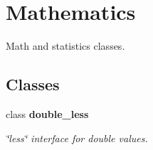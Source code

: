 \section{Mathematics}
\label{group___mathematics}


Math and statistics classes.  


\subsection*{Classes}
\begin{DoxyCompactItemize}
\item 
class {\bf double\+\_\+less}
\begin{DoxyCompactList}\small\item\em \char`\"{}less\char`\"{} interface for double values. \end{DoxyCompactList}\end{DoxyCompactItemize}
